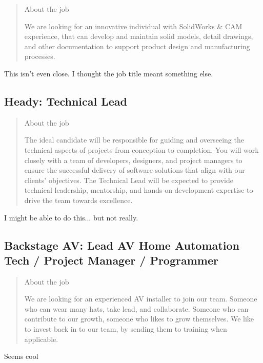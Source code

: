 \documentclass[
	letterpaper, %
	12pt, %
]{CSSullivanBusinessReport}
\begin{document}
\begin{quote}
	About the job
	
	We are looking for an innovative individual with SolidWorks \& CAM experience, that can develop and maintain solid models, detail drawings, and other documentation to support product design and manufacturing processes.

\end{quote}

This isn't even close. I thought the job title meant something else.


\subsection[Heady]{Heady: Technical Lead}

\begin{quote}
	About the job
	
	The ideal candidate will be responsible for guiding and overseeing the technical aspects of projects from conception to completion. You will work closely with a team of developers, designers, and project managers to ensure the successful delivery of software solutions that align with our clients' objectives. The Technical Lead will be expected to provide technical leadership, mentorship, and hands-on development expertise to drive the team towards excellence.

\end{quote}

I might be able to do this... but not really.


\subsection[Backstage AV]{Backstage AV: Lead AV Home Automation Tech / Project Manager / Programmer}

\begin{quote}
	About the job
	
	We are looking for an experienced AV installer to join our team. Someone who can wear many hats, take lead, and collaborate. Someone who can contribute to our growth, someone who likes to grow themselves. We like to invest back in to our team, by sending them to training when applicable.

\end{quote}

Seems cool
\end{document}
